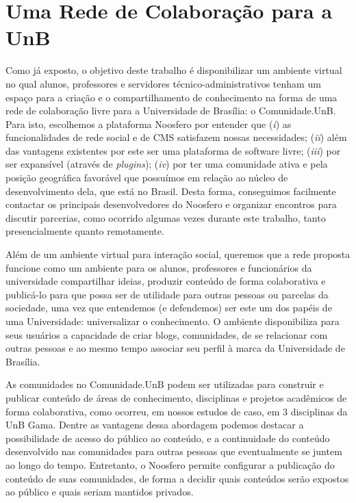 \chapter{Uma Rede de Colaboração para a UnB}

Como já exposto, o objetivo deste trabalho é disponibilizar um ambiente
virtual no qual alunos, professores e servidores técnico-administrativos tenham
um espaço para a criação e o compartilhamento de conhecimento na forma de uma
rede de colaboração livre para a Universidade de Brasília: o Comunidade.UnB.
%
Para isto, escolhemos a plataforma Noosfero por entender que
(\textit{i}) as funcionalidades de rede social e de CMS satisfazem nossas
necessidades; (\textit{ii}) além das vantagens existentes por este ser uma
plataforma de software livre; (\textit{iii}) por ser  expansível (através de
\textit{plugins}); (\textit{iv}) por ter uma comunidade ativa e pela posição
geográfica favorável que possuímos em relação ao núcleo de desenvolvimento
dela, que está no Brasil.
%
Desta forma, conseguimos facilmente contactar os principais desenvolvedores
do Noosfero e organizar encontros para discutir parcerias, como ocorrido
algumas vezes durante este trabalho, tanto presencialmente quanto remotamente.

Além de um ambiente virtual para interação social, queremos que a rede proposta
funcione como um ambiente para os alunos, professores e funcionários da
universidade compartilhar ideias, produzir conteúdo de forma colaborativa e
publicá-lo para que possa ser de utilidade para outras pessoas ou parcelas da
sociedade, uma vez que entendemos (e defendemos) ser este um dos papéis de uma
Universidade: universalizar o conhecimento.
%
O ambiente disponibiliza para seus usuários a capacidade de criar blogs,
comunidades, de se relacionar com outras pessoas e ao mesmo tempo associar seu
perfil à marca da Universidade de Brasília.

As comunidades no Comunidade.UnB podem ser utilizadas para construir e publicar
conteúdo de áreas de conhecimento, disciplinas e projetos acadêmicos de forma
colaborativa, como ocorreu, em nossos estudos de caso, em 3 disciplinas da UnB Gama.
%
Dentre as vantagens dessa abordagem podemos destacar a possibilidade de
acesso do público ao conteúdo, e a continuidade do conteúdo desenvolvido
nas comunidades para outras pessoas que eventualmente se juntem ao longo do tempo.
%
Entretanto, o Noosfero permite configurar a publicação do conteúdo de suas
comunidades, de forma a decidir quais conteúdos serão expostos ao público e
quais seriam mantidos privados.


